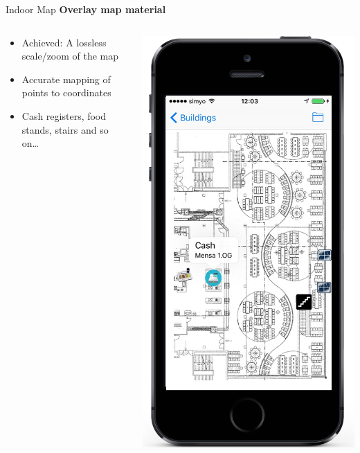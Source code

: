 \documentclass[11pt]{beamer}
\begin{document}
\begin{frame}{Indoor Map}
\textbf{Overlay map material}
  \begin{columns}[T]
  \begin{column}{.6\textwidth}
  \begin{itemize}
    \item Achieved: A lossless scale/zoom of the map
    \item Accurate mapping of points to coordinates
    \item Cash registers, food stands, stairs and so on\ldots
  \end{itemize}
  \end{column}
  \begin{column}{.4\textwidth}
    \includegraphics[scale=0.25]{mapmensainfo}
  \end{column}
\end{columns}
\end{frame}
\end{document}
